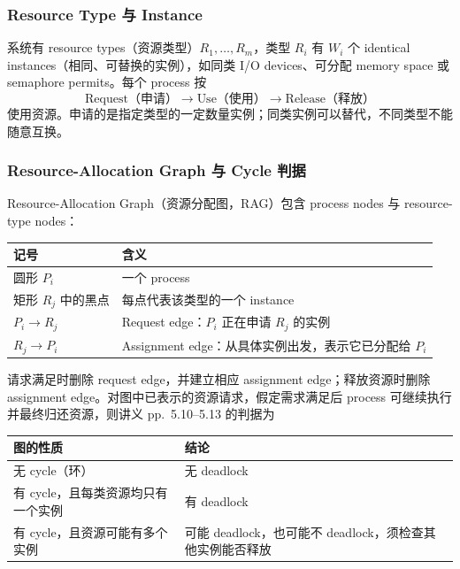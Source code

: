\subsubsection{Resource Type 与 Instance}

系统有 resource types（资源类型）$R_1,\ldots,R_m$，类型 $R_i$ 有 $W_i$ 个 identical instances（相同、可替换的实例），如同类 I/O devices、可分配 memory space 或 semaphore permits。每个 process 按
\[
  \text{Request（申请）}\longrightarrow
  \text{Use（使用）}\longrightarrow
  \text{Release（释放）}
\]
使用资源。申请的是指定类型的一定数量实例；同类实例可以替代，不同类型不能随意互换。

\subsubsection{Resource-Allocation Graph 与 Cycle 判据}

Resource-Allocation Graph（资源分配图，RAG）包含 process nodes 与 resource-type nodes：
\begin{center}
\begin{tabularx}{0.97\textwidth}{@{}lX@{}}
  \toprule
  记号 & 含义 \\
  \midrule
  圆形 $P_i$ & 一个 process \\
  矩形 $R_j$ 中的黑点 & 每点代表该类型的一个 instance \\
  $P_i\rightarrow R_j$ & Request edge：$P_i$ 正在申请 $R_j$ 的实例 \\
  $R_j\rightarrow P_i$ & Assignment edge：从具体实例出发，表示它已分配给 $P_i$ \\
  \bottomrule
\end{tabularx}
\end{center}
请求满足时删除 request edge，并建立相应 assignment edge；释放资源时删除 assignment edge。对图中已表示的资源请求，假定需求满足后 process 可继续执行并最终归还资源，则讲义 pp.~5.10--5.13 的判据为
\begin{center}
\begin{tabularx}{0.97\textwidth}{@{}lX@{}}
  \toprule
  图的性质 & 结论 \\
  \midrule
  无 cycle（环） & 无 deadlock \\
  有 cycle，且每类资源均只有一个实例 & 有 deadlock \\
  有 cycle，且资源可能有多个实例 & 可能 deadlock，也可能不 deadlock，须检查其他实例能否释放 \\
  \bottomrule
\end{tabularx}
\end{center}

